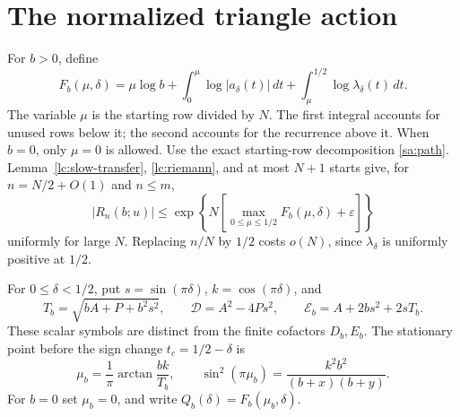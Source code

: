 \section{The normalized triangle action}\label{lc:action}
For \(b>0\), define
\begin{equation}\label{lc:F}
 F_b(\mu,\delta)=\mu\log b+
 \int_0^\mu\log|a_\delta(t)|\,dt+
 \int_\mu^{1/2}\log\lambda_\delta(t)\,dt .
\end{equation}
The variable $\mu$ is the starting row divided by $N$. The first
integral accounts for unused rows below it; the second accounts for
the recurrence above it. When $b=0$, only $\mu=0$ is allowed.
Use the exact starting-row decomposition \eqref{sa:path}.
Lemma~\ref{lc:slow-transfer}, \eqref{lc:riemann}, and at most \(N+1\)
starts give, for \(n=N/2+O(1)\) and \(n\le m\),
\begin{equation}\label{lc:cofactor-rate}
 |R_n(b;u)|\le
 \exp\left\{N\left[\max_{0\le\mu\le1/2}F_b(\mu,\delta)
                                      +\varepsilon\right]\right\}
\end{equation}
uniformly for large \(N\). Replacing \(n/N\) by \(1/2\) costs \(o(N)\),
since \(\lambda_\delta\) is uniformly positive at \(1/2\).

For \(0\le\delta<1/2\), put \(s=\sin(\pi\delta)\), \(k=\cos(\pi\delta)\),
and
\[
 T_b=\sqrt{bA+P+b^2s^2},\qquad
 \mathcal D=A^2-4Ps^2,\qquad
 \mathcal E_b=A+2bs^2+2sT_b.
\]
These scalar symbols are distinct from the finite cofactors \(D_b,E_b\).
The stationary point before the sign change \(t_c=1/2-\delta\) is
\begin{equation}\label{lc:mu}
 \mu_b=\frac1\pi\arctan\frac{bk}{T_b},\qquad
 \sin^2(\pi\mu_b)=\frac{k^2b^2}{(b+x)(b+y)}.
\end{equation}
For \(b=0\) set \(\mu_b=0\), and write
\(Q_b(\delta)=F_b(\mu_b,\delta)\).

